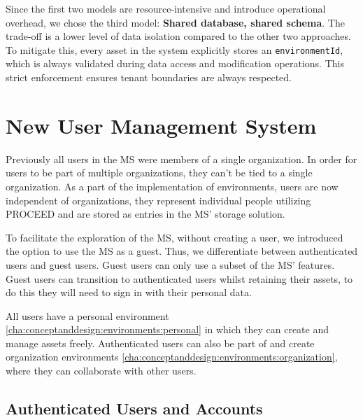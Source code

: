 Since the first two models are resource-intensive and introduce operational
overhead, we chose the third model: \textbf{Shared database, shared schema}.
The trade-off is a lower level of data isolation compared to the other two approaches.
To mitigate this, every asset in the system explicitly stores an \lstinline{environmentId},
which is always validated during data access and modification operations.
This strict enforcement ensures tenant boundaries are always respected.


\section{New User Management System}
\label{cha:conceptanddesign:users}

Previously all users in the MS were members of a single organization.
In order for users to be part of multiple organizations, they can't be tied to a single
organization.
As a part of the implementation of environments, users are now independent of
organizations,
they represent individual people utilizing PROCEED and are stored as entries in
the MS' storage solution.

To facilitate the exploration of the MS, without creating a user, we introduced the option
to use the MS as a guest.
Thus, we differentiate between authenticated users and guest users.
Guest users can only use a subset of the MS' features.
Guest users can transition to authenticated users whilst retaining their
assets, to do this they will need to sign in with their personal data.

All users have a personal environment \ref{cha:conceptanddesign:environments:personal}
in which they can create and manage assets freely.
Authenticated users can also be part of and create organization environments
\ref{cha:conceptanddesign:environments:organization},
where they can collaborate with other users.

\subsection{Authenticated Users and Accounts}

